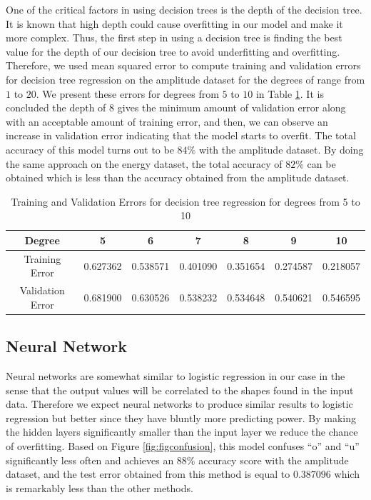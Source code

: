 \documentclass[letterpaper,12pt]{article}
\begin{document}
One of the critical factors in using decision trees is the depth of the decision tree. It is known that high depth could cause overfitting in our model and make it more complex. Thus, the first step in using a decision tree is finding the best value for the depth of our decision tree to avoid underfitting and overfitting. Therefore, we used mean squared error to compute training and validation errors for decision tree regression on the amplitude dataset for the degrees of range from $1$ to $20$. We present these errors for degrees from $5$ to $10$ in Table \ref{tab:trainValErr}. It is concluded the depth of $8$ gives the minimum amount of validation error along with an acceptable amount of training error, and then, we can observe an increase in validation error indicating that the model starts to overfit. The total accuracy of this model turns out to be $84\%$ with the amplitude dataset. By doing the same approach on the energy dataset, the total accuracy of $82\%$ can be obtained which is less than the accuracy obtained from the amplitude dataset.

\begin{table}
\centering
\begin{tabular}{ |c|c|c|c|c|c|c| } 
\hline
 Degree & 5 & 6 & 7 & 8 & 9 & 10 \\  \hline
 Training Error & 0.627362 & 0.538571 & 0.401090 & 0.351654 & 0.274587  & 0.218057\\ 
 \hline
 Validation Error & 0.681900 & 0.630526 & 0.538232 & 0.534648 & 0.540621 & 0.546595 \\ 
 \hline
\end{tabular}
\caption{\label{tab:trainValErr}Training and Validation Errors for decision tree regression for degrees from 5 to 10}
\end{table}
\subsection{Neural Network}

Neural networks are somewhat similar to logistic regression in our case in the sense that the output values will be correlated to the shapes found in the input data. Therefore we expect neural networks to produce similar results to logistic regression but better since they have bluntly more predicting power. By making the hidden layers significantly smaller than the input layer we reduce the chance of overfitting. Based on Figure \ref{fig:figconfusion}, this model confuses ``o'' and ``u'' significantly less often and achieves an $88\%$ accuracy score with the amplitude dataset, and the test error obtained from this method is equal to $0.387096$ which is remarkably less than the other methods.
\end{document}

